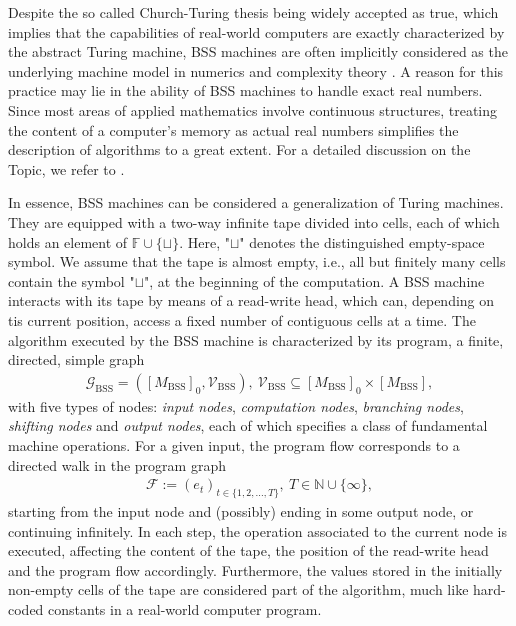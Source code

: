 \documentclass[conference]{IEEEtran}
\def\G{{\mathcal G}}
\def\V{{\mathcal V}}
\def\F{{\mathcal F}}
\def\NN{{\mathbb N}}
\def\FF{{\mathbb F}}
\newcommand{\BSS}{\mathrm{BSS}}
\newcommand{\sdummy}{{\color{red}[SOURCE]}}
\newcommand{\tbr}[1]{}
\begin{document}
	Despite the so called Church-Turing thesis being widely accepted as true, which implies that the capabilities of real-world computers are exactly characterized 
	by the abstract Turing machine, BSS machines are often implicitly considered as the underlying machine model in numerics and complexity theory \tbr{\sdummy}. 
	A reason for this practice may lie in the ability of BSS machines to handle exact real numbers. Since most areas of applied mathematics involve continuous structures, 
	treating the content of a computer's memory as actual real numbers simplifies the description of algorithms to a great extent. For a detailed discussion on the Topic, we refer to \cite{Bl04}.

	In essence, BSS machines can be considered a generalization of Turing machines. They are equipped with a two-way infinite tape divided into cells, each of which holds an 
	element of \(\FF\cup\{\sqcup\}\). Here, "\(\sqcup\)" denotes the distinguished empty-space symbol. We assume that the tape is almost empty, i.e., all but finitely many cells 
	contain the symbol "\(\sqcup\)", at the beginning of the computation. A BSS machine interacts with its tape by means of a read-write head, which can, depending on tis current 
	position, access a fixed number of contiguous cells at a time. The algorithm executed by the BSS machine is characterized by its program, a finite, directed, simple graph 
	\begin{align*}   \G_\BSS = ([M_\BSS]_{0}, \V_\BSS),~ \V_\BSS \subseteq [M_\BSS]_{0} \times [M_\BSS],
	\end{align*} 
	with five types of nodes: \emph{input nodes}, \emph{computation nodes}, \emph{branching nodes}, \emph{shifting nodes} and \emph{output nodes}, each of which specifies a class 
	of fundamental machine operations. For a given input, the program flow corresponds to a directed walk in the program graph
	\begin{align*}	\F := (e_t)_{t\in\{1,2,\ldots,T\}},~T\in\NN\cup \{\infty\},
	\end{align*}
	starting from the input node and (possibly) ending in some output node, or continuing infinitely. In each step, the operation associated to the current node is executed, 
	affecting the content of the tape, the position of the read-write head and the program flow accordingly. Furthermore, the values stored in the initially non-empty cells 
	of the tape are considered part of the algorithm, much like hard-coded constants in a real-world computer program. 
\end{document}
